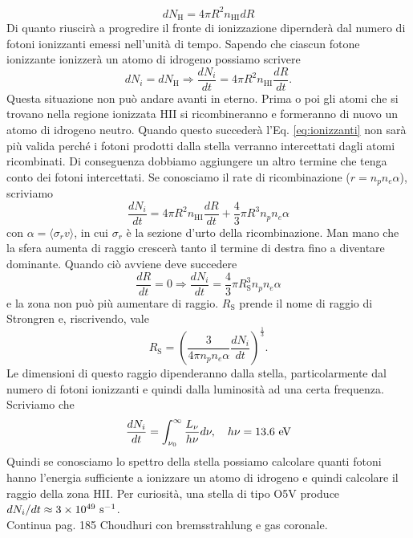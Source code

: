 \begin{equation}
    dN_\text{H} = 4\pi R^2 n_\text{HI} dR
\end{equation}
Di quanto riuscirà a progredire il fronte di ionizzazione dipernderà dal numero di fotoni ionizzanti emessi nell'unità di tempo. Sapendo che ciascun fotone ionizzante ionizzerà un atomo di idrogeno possiamo scrivere 
\begin{equation}
    dN_i= dN_\text{H} \Rightarrow \frac{dN_i}{dt} = 4\pi R^2 n_\text{HI} \frac{dR}{dt}.
    \label{eq:ionizzanti}
\end{equation}
Questa situazione non può andare avanti in eterno. Prima o poi gli atomi che si trovano nella regione ionizzata HII si ricombineranno e formeranno di nuovo un atomo di idrogeno neutro. Quando questo succederà l'Eq. \ref{eq:ionizzanti} non sarà più valida perché i fotoni prodotti dalla stella verranno intercettati dagli atomi ricombinati. Di conseguenza dobbiamo aggiungere un altro termine che tenga conto dei fotoni intercettati. Se conosciamo il rate di ricombinazione ($r=n_pn_e\alpha$), scriviamo
\begin{equation}
    \frac{dN_i}{dt} = 4\pi R^2 n_\text{HI} \frac{dR}{dt}+ \frac{4}{3}\pi R^3 n_pn_e\alpha
    \label{eq:ricombinati}
\end{equation}
con $\alpha=\langle\sigma_rv\rangle$, in cui $\sigma_r$ è la sezione d'urto della ricombinazione. Man mano che la sfera aumenta di raggio crescerà tanto il termine di destra fino a diventare dominante. Quando ciò avviene deve succedere
\begin{equation}
    \frac{dR}{dt}=0 \Rightarrow \frac{dN_i}{dt}=\frac{4}{3}\pi R_\text{S}^3 n_pn_e\alpha
\end{equation}
e la zona non può più aumentare di raggio. $R_\text{S}$ prende il nome di raggio di Strongren e, riscrivendo, vale
\begin{equation}
    R_\text{S}=\left(\frac{3}{4\pi n_pn_e\alpha}\frac{dN_i}{dt}\right)^{\frac{1}{3}}.
\end{equation}
Le dimensioni di questo raggio dipenderanno dalla stella, particolarmente dal numero di fotoni ionizzanti e quindi dalla luminosità ad una certa frequenza. Scriviamo che
\begin{equation}
    \frac{dN_i}{dt} = \int_{\nu_{0}}^{\infty} \frac{L_\nu}{h\nu}d\nu,\quad h\nu=13.6\text{ eV}
\end{equation}
Quindi se conosciamo lo spettro della stella possiamo calcolare quanti fotoni hanno l'energia sufficiente a ionizzare un atomo di idrogeno e quindi calcolare il raggio della zona HII. Per curiosità, una stella di tipo O5V produce ${dN_i}/{dt}\approx 3\times10^{49}\text{ s}^{-1}$.\\
Continua pag. 185 Choudhuri con bremsstrahlung e gas coronale.